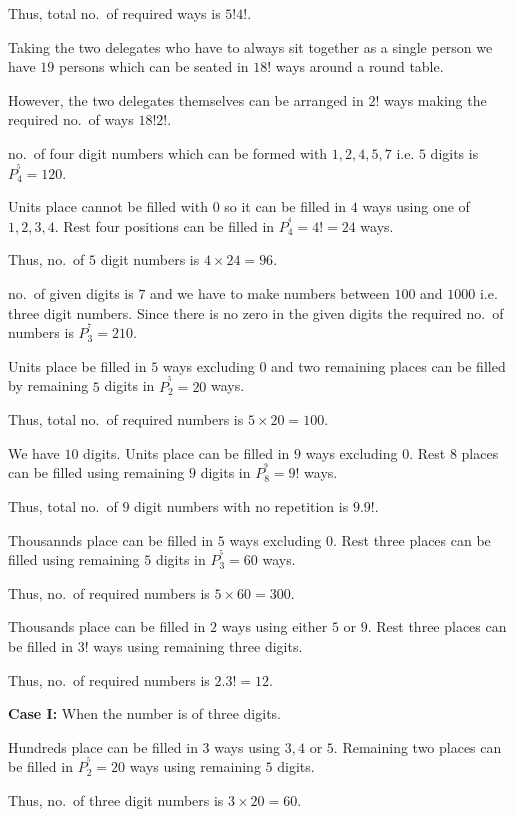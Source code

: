   Thus, total no.\ of required ways is $5!4!$.
\item Taking the two delegates who have to always sit together as a single person we have $19$ persons
  which can be seated in $18!$ ways around a round table.

  However, the two delegates themselves can be arranged in $2!$ ways making the required no.\ of ways
  $18!2!$.
\item no.\ of four digit numbers which can be formed with $1, 2, 4, 5, 7$ i.e. $5$ digits is $P_4^^5 = 120$.
\item Units place cannot be filled with $0$ so it can be filled in $4$ ways using one of $1, 2, 3, 4$. Rest
  four positions can be filled in $P_4^^4 = 4! = 24$ ways.

  Thus, no.\ of $5$ digit numbers is $4\times24 = 96$.
\item no.\ of given digits is $7$ and we have to make numbers between $100$ and $1000$ i.e. three digit
  numbers. Since there is no zero in the given digits the required no.\ of numbers is $P_3^^7 = 210$.
\item Units place be filled in $5$ ways excluding $0$ and two remaining places can be filled by remaining
  $5$ digits in $P_2^^5 = 20$ ways.

  Thus, total no.\ of required numbers is $5\times20 = 100$.
\item We have $10$ digits. Units place can be filled in $9$ ways excluding $0$. Rest $8$ places can be
  filled using remaining $9$ digits in $P_8^^9 = 9!$ ways.

  Thus, total no.\ of $9$ digit numbers with no repetition is $9.9!$.
\item Thousannds place can be filled in $5$ ways excluding $0$. Rest three places can be filled using
  remaining $5$ digits in $P_3^^5 = 60$ ways.

  Thus, no.\ of required numbers is $5\times60 = 300$.
\item Thousands place can be filled in $2$ ways using either $5$ or $9$. Rest three places can be filled in
  $3!$ ways using remaining three digits.

  Thus, no.\ of required numbers is $2.3! = 12$.
\item {\bf Case I:} When the number is of three digits.

  Hundreds place can be filled in $3$ ways using $3, 4$ or $5$. Remaining two places can be filled in
  $P_2^^5 = 20$ ways using remaining $5$ digits.

  Thus, no.\ of three digit numbers is $3\times20 = 60$.


